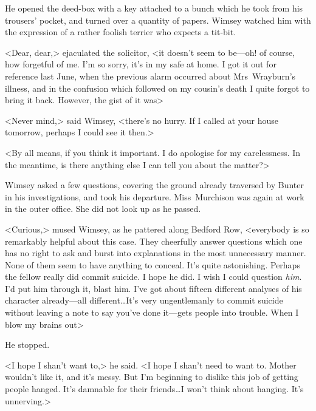He opened the deed-box with a key attached to a bunch which he took from his trousers' pocket, and turned over a quantity of papers. Wimsey watched him with the expression of a rather foolish terrier who expects a tit-bit.

<Dear, dear,> ejaculated the solicitor, <it doesn't seem to be—oh! of course, how forgetful of me. I'm so sorry, it's in my safe at home. I got it out for reference last June, when the previous alarm occurred about Mrs~Wrayburn's illness, and in the confusion which followed on my cousin's death I quite forgot to bring it back. However, the gist of it was\longdash>

<Never mind,> said Wimsey, <there's no hurry. If I called at your house tomorrow, perhaps I could see it then.>

<By all means, if you think it important. I do apologise for my carelessness. In the meantime, is there anything else I can tell you about the matter?>

Wimsey asked a few questions, covering the ground already traversed by Bunter in his investigations, and took his departure. Miss~Murchison was again at work in the outer office. She did not look up as he passed.

<Curious,> mused Wimsey, as he pattered along Bedford Row, <everybody is so remarkably helpful about this case. They cheerfully answer questions which one has no right to ask and burst into explanations in the most unnecessary manner. None of them seem to have anything to conceal. It's quite astonishing. Perhaps the fellow really did commit suicide. I hope he did. I wish I could question \emph{him}. I'd put him through it, blast him. I've got about fifteen different analyses of his character already—all different\dots It's very ungentlemanly to commit suicide without leaving a note to say you've done it—gets people into trouble. When I blow my brains out\longdash>

He stopped.

<I hope I shan't want to,> he said. <I hope I shan't need to want to. Mother wouldn't like it, and it's messy. But I'm beginning to dislike this job of getting people hanged. It's damnable for their friends\dots I won't think about hanging. It's unnerving.>